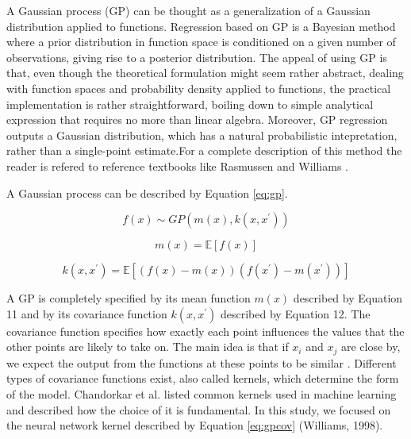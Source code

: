  A Gaussian process (GP) can be thought as a generalization of a Gaussian distribution applied to functions. 
 Regression based on GP is a Bayesian method where a prior distribution in function space is conditioned on a 
 given number of observations, giving rise to a posterior distribution. The appeal of using GP is that, even 
 though the theoretical formulation might seem rather abstract, dealing with function spaces and probability 
 density applied to functions, the practical implementation is rather straightforward, boiling down to simple 
 analytical expression that requires no more than linear algebra. Moreover, GP regression outputs a Gaussian 
 distribution, which has a natural probabilistic intepretation, rather than a single-point estimate.For a complete 
 description of this method the reader is refered to reference textbooks like Rasmussen and Williams 
 \cite{Rasmussen:2005:GPM:1162254}. 

A Gaussian process can be described by Equation \ref{eq:gp}. 

\begin{equation}\label{eq:gp}
 f \left( x \right)  \sim  GP \left( m \left( x \right) , k \left( x,x^{'} \right)  \right) 
\end{equation}

\begin{equation}\label{eq:meanfunc}
 m \left( x \right) = \mathbb{E} \left[ f \left( x \right)  \right]
\end{equation}

\begin{equation}\label{eq:kernelfunc}
 k ( x,x^{'}) = \mathbb{E} \left[  \left( f \left( x \right) -m \left( x \right)  \right)  ( f ( x^{'} ) -m ( x^{'}) )  \right]
\end{equation}


A GP is completely specified by its mean function  \( m \left( x \right)  \) described by 
Equation 11 and by its covariance function  \( k \left( x,x^{'} \right)  \)  described by Equation 12. 
The covariance function specifies how exactly each point influences the values that the other points are 
likely to take on. The main idea is that if  \( x_{i} \) and  \( x_{j} \)  are close by, 
we expect the output from the functions at these points to be similar . Different types of covariance 
functions exist, also called kernels, which determine the form of the model. Chandorkar et al. \cite{ChandorkarDst} 
listed common kernels used in machine learning and described how the choice of it is fundamental. 
In this study, we focused on the neural network kernel described by Equation \ref{eq:gpcov} (Williams, 1998). 


